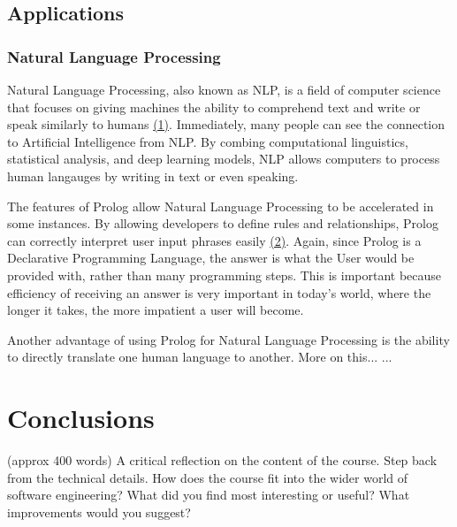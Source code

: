 \documentclass{article}
\theoremstyle{theorem}
\theoremstyle{definition}
\theoremstyle{remark}
\begin{document}
\subsection{Applications}

\subsubsection{Natural Language Processing}
\noindent\newline Natural Language Processing, also known as NLP, is a field of computer science that focuses on giving machines the ability to comprehend text and write or speak similarly to humans \href{https://www.ibm.com/topics/natural-language-processing}{(1)}. Immediately, many people can see the connection to Artificial Intelligence from NLP.  By combing computational linguistics, statistical analysis, and deep learning models, NLP allows computers to process human langauges by writing in text or even speaking.

\noindent\newline The features of Prolog allow Natural Language Processing to be accelerated in some instances. By allowing developers to define rules and relationships, Prolog can correctly interpret user input phrases easily \href{https://www.cs.unm.edu/~luger/ai-final2/CH8_Natural%20Language%20Processing%20in%20Prolog.pdf}{(2)}. Again, since Prolog is a Declarative Programming Language, the answer is what the User would be provided with, rather than many programming steps. This is important because efficiency of receiving an answer is very important in today's world, where the longer it takes, the more impatient a user will become. 


\noindent\newline Another advantage of using Prolog for Natural Language Processing is the ability to directly translate one human language to another. More on this...
...

\section{Conclusions}\label{conclusions}

(approx 400 words) A critical reflection on the content of the course. Step back from the technical details. How does the course fit into the wider world of software engineering? What did you find most interesting or useful? What improvements would you suggest?
\end{document}
